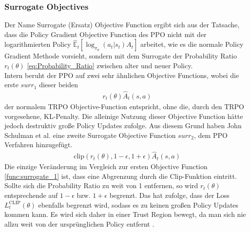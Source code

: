 \subsubsection{Surrogate Objectives} \label{sec:Surrogate_Objectives}
Der Name Surrogate (Ersatz) Objective Function ergibt sich aus der Tatsache, dass die Policy Gradient Objective Function des PPO nicht mit der logarithmierten Policy $\mathbb{\hat{E}}_t[\log_{\pi_{\theta}}(a_t|s_t)A_t]$ arbeitet, wie es die normale Policy Gradient Methode vorsieht, sondern mit dem Surrogate der Probability Ratio $r_{t}(\theta)$ \ref{eq:Probability_Ratio} zwischen alter und neuer Policy.\\
Intern beruht der PPO auf zwei sehr ähnlichen Objective Functions, wobei die erste $surr_1$ dieser beiden
\begin{align}
	\label{eq:surrogate_1}
	r_{t}(\theta) \hat{A}_{t}(s, a)
\end{align}
der normalem TRPO Objective-Function entspricht, ohne die, durch den TRPO vorgesehene, KL-Penalty. \cite[S. 3 f.]{PPO}
Die alleinige Nutzung dieser Objective Function hätte jedoch destruktiv große Policy Updates zufolge. Aus diesem Grund haben John Schulman et al. eine zweite Surrogate Objective Function $surr_2$, dem PPO Verfahren hinzugefügt. 
\begin{align}
	\label{eq:surrogate_2}
	\text{clip}(r_{t}(\theta), 1 - \epsilon, 1 + \epsilon) \hat{A}_{t}(s, a)
\end{align}
Die einzige Veränderung im Vergleich zur ersten Objective Function \ref{func:surrogate_1} ist, dass eine Abgrenzung durch die Clip-Funktion eintritt. Sollte sich die Probability Ratio zu weit von 1 entfernen, so wird $r_{t}(\theta)$ entsprechende auf $1 - \epsilon \text{ bzw. } 1 + \epsilon$ begrenzt. Das hat zufolge, dass der Loss $L^{\text{CLIP}}_{t}(\theta)$ ebenfalls begrenzt wird, sodass es zu keinen großen Policy Updates kommen kann. Es wird sich daher in einer Trust Region bewegt, da man sich nie allzu weit von der ursprünglichen Policy entfernt \cite{TRPO, PPO}.

